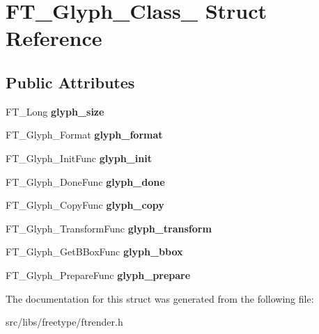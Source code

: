 \hypertarget{struct_f_t___glyph___class__}{
\section{FT\_\-Glyph\_\-Class\_\- Struct Reference}
\label{struct_f_t___glyph___class__}
}
\subsection*{Public Attributes}
\begin{DoxyCompactItemize}
\item 
\hypertarget{struct_f_t___glyph___class___a1a76c68b9fb0e93947e888c0fe77cbf8}{
FT\_\-Long {\bfseries glyph\_\-size}}
\label{struct_f_t___glyph___class___a1a76c68b9fb0e93947e888c0fe77cbf8}

\item 
\hypertarget{struct_f_t___glyph___class___a26738bd14d5845e18d09ccaa3a709d23}{
FT\_\-Glyph\_\-Format {\bfseries glyph\_\-format}}
\label{struct_f_t___glyph___class___a26738bd14d5845e18d09ccaa3a709d23}

\item 
\hypertarget{struct_f_t___glyph___class___a657200ad15ff061b38fb25b168737f95}{
FT\_\-Glyph\_\-InitFunc {\bfseries glyph\_\-init}}
\label{struct_f_t___glyph___class___a657200ad15ff061b38fb25b168737f95}

\item 
\hypertarget{struct_f_t___glyph___class___aabf05a4368dccacf45e1a54e542e5d63}{
FT\_\-Glyph\_\-DoneFunc {\bfseries glyph\_\-done}}
\label{struct_f_t___glyph___class___aabf05a4368dccacf45e1a54e542e5d63}

\item 
\hypertarget{struct_f_t___glyph___class___afc78dcdc4802760ebcaccf3a7b6cd088}{
FT\_\-Glyph\_\-CopyFunc {\bfseries glyph\_\-copy}}
\label{struct_f_t___glyph___class___afc78dcdc4802760ebcaccf3a7b6cd088}

\item 
\hypertarget{struct_f_t___glyph___class___a5f72ac1d0d92eb31fa3e2bb721a97ef2}{
FT\_\-Glyph\_\-TransformFunc {\bfseries glyph\_\-transform}}
\label{struct_f_t___glyph___class___a5f72ac1d0d92eb31fa3e2bb721a97ef2}

\item 
\hypertarget{struct_f_t___glyph___class___a06bfad431865c6731305cb781f78b317}{
FT\_\-Glyph\_\-GetBBoxFunc {\bfseries glyph\_\-bbox}}
\label{struct_f_t___glyph___class___a06bfad431865c6731305cb781f78b317}

\item 
\hypertarget{struct_f_t___glyph___class___af7f406e5ea20a6614c946746938830c9}{
FT\_\-Glyph\_\-PrepareFunc {\bfseries glyph\_\-prepare}}
\label{struct_f_t___glyph___class___af7f406e5ea20a6614c946746938830c9}

\end{DoxyCompactItemize}


The documentation for this struct was generated from the following file:\begin{DoxyCompactItemize}
\item 
src/libs/freetype/ftrender.h\end{DoxyCompactItemize}
